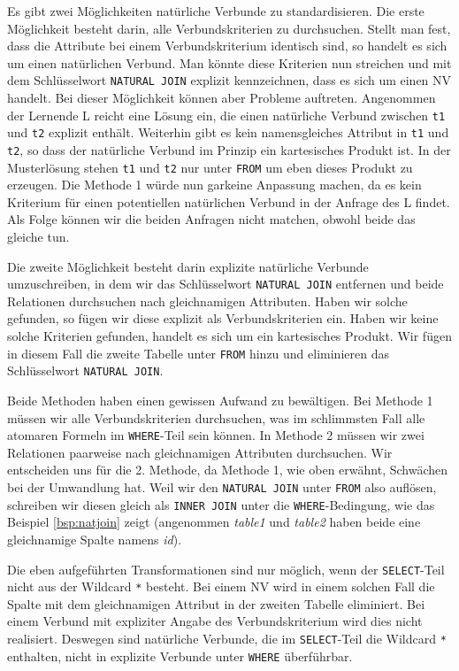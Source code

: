 Es gibt zwei Möglichkeiten natürliche Verbunde zu standardisieren. Die erste Möglichkeit besteht darin,   alle Verbundskriterien zu durchsuchen. Stellt man fest, dass die Attribute bei einem Verbundskriterium identisch sind, so handelt es sich um einen natürlichen Verbund. Man könnte diese Kriterien nun streichen und mit dem Schlüsselwort \verb|NATURAL JOIN| explizit kennzeichnen, dass es sich um einen NV handelt. Bei dieser Möglichkeit können aber Probleme auftreten. Angenommen der Lernende L reicht eine Lösung ein, die einen natürliche Verbund zwischen \verb|t1| und \verb|t2| explizit enthält. Weiterhin gibt es kein namensgleiches Attribut in \verb|t1| und \verb|t2|, so dass der natürliche Verbund im Prinzip ein kartesisches Produkt ist. In der Musterlösung stehen \verb|t1| und \verb|t2| nur unter \verb|FROM| um eben dieses Produkt zu erzeugen. Die Methode 1 würde nun garkeine Anpassung machen, da es kein Kriterium für einen potentiellen natürlichen Verbund in der Anfrage des L findet. Als Folge können wir die beiden Anfragen nicht matchen, obwohl beide das gleiche tun.

Die zweite Möglichkeit besteht darin explizite natürliche Verbunde umzuschreiben, in dem wir das Schlüsselwort \verb|NATURAL JOIN| entfernen und beide Relationen durchsuchen nach gleichnamigen Attributen. Haben wir solche gefunden, so fügen wir diese explizit als Verbundskriterien ein. Haben wir keine solche Kriterien gefunden, handelt es sich um ein kartesisches Produkt. Wir fügen in diesem Fall die zweite Tabelle unter \verb|FROM| hinzu und eliminieren das Schlüsselwort \verb|NATURAL JOIN|.

Beide Methoden haben einen gewissen Aufwand zu bewältigen. Bei Methode 1 müssen wir alle Verbundskriterien durchsuchen, was im schlimmsten Fall alle atomaren Formeln im \verb|WHERE|-Teil sein können. In Methode 2 müssen wir zwei Relationen paarweise nach gleichnamigen Attributen durchsuchen.
Wir entscheiden uns für die 2. Methode, da Methode 1, wie oben erwähnt, Schwächen bei der Umwandlung hat. Weil wir den \verb|NATURAL JOIN| unter \verb|FROM| also auflösen, schreiben wir diesen gleich als \verb|INNER JOIN| unter die \verb|WHERE|-Bedingung, wie das  Beispiel \ref{bsp:natjoin} zeigt (angenommen \textit{table1} und \textit{table2} haben beide eine gleichnamige Spalte namens \textit{id}).

Die eben aufgeführten Transformationen sind nur möglich, wenn der \verb|SELECT|-Teil nicht aus der Wildcard \verb|*| besteht. Bei einem NV wird in einem solchen Fall die Spalte mit dem gleichnamigen Attribut in der zweiten Tabelle eliminiert. Bei einem Verbund mit expliziter Angabe des Verbundskriterium wird dies nicht realisiert. Deswegen sind natürliche Verbunde, die im \verb|SELECT|-Teil die Wildcard \verb|*| enthalten, nicht in explizite Verbunde unter \verb|WHERE| überführbar.

